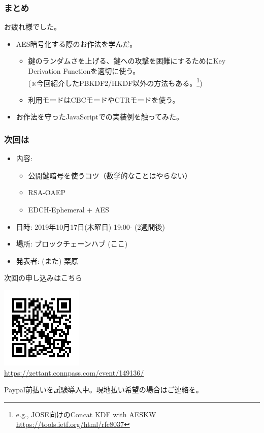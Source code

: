 \documentclass[12pt,dvipdfmx]{beamer}
\begin{document}
\begin{frame}
\frametitle{まとめ}
お疲れ様でした。

\begin{itemize}
\item AES暗号化する際のお作法を学んだ。
\begin{itemize}
 \item 鍵のランダムさを上げる、鍵への攻撃を困難にするためにKey Derivation Functionを適切に使う。\\
(※今回紹介したPBKDF2/HKDF以外の方法もある。\footnote[frame]{\scriptsize e.g., JOSE向けのConcat KDF with AESKW \url{https://tools.ietf.org/html/rfc8037}})
 \item 利用モードはCBCモードやCTRモードを使う。
\end{itemize}
\item お作法を守ったJavaScriptでの実装例を触ってみた。
\end{itemize}
\end{frame}

\begin{frame}
\frametitle{次回は}
\begin{itemize}
 \item 内容: 
\begin{itemize}
 \item 公開鍵暗号を使うコツ（数学的なことはやらない）
 \item RSA-OAEP
 \item EDCH-Ephemeral + AES
\end{itemize}
 \item 日時: 2019年10月17日(木曜日) 19:00- (2週間後)
 \item 場所: ブロックチェーンハブ (ここ)
 \item 発表者: (また) 栗原
\end{itemize}
\end{frame}

\begin{frame}
次回の申し込みはこちら

\begin{center}
 \includegraphics[width=0.6\linewidth]{FigsSample02/QR_Code1570031022.png}\\[-2ex]
\url{https://zettant.connpass.com/event/149136/}
\end{center}

\alert{Paypal前払いを試験導入中}。現地払い希望の場合はご連絡を。
\end{frame}
\end{document}
